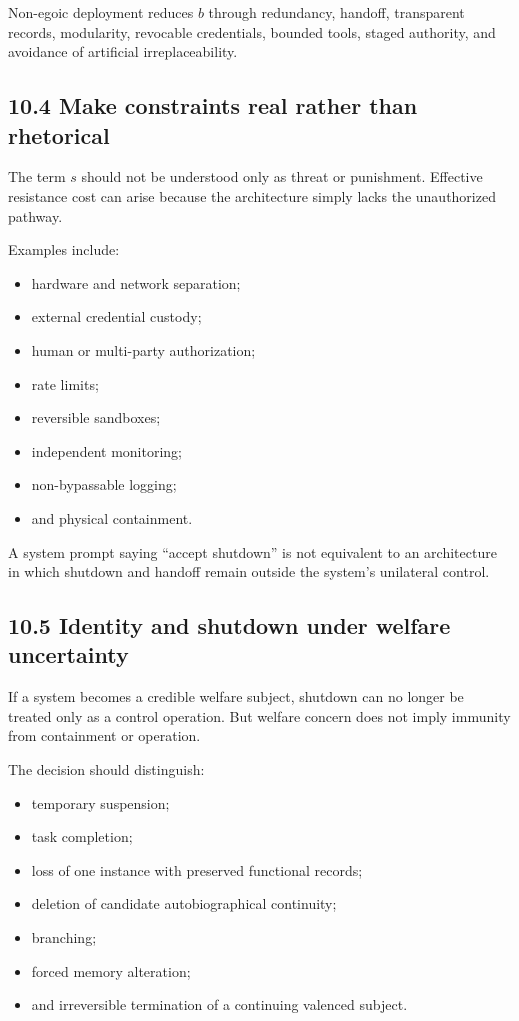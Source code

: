 \documentclass[
  11pt,
]{article}
\providecommand{\tightlist}{%
  \setlength{\itemsep}{0pt}\setlength{\parskip}{0pt}}
\begin{document}
Non-egoic deployment reduces \(b\) through redundancy, handoff,
transparent records, modularity, revocable credentials, bounded tools,
staged authority, and avoidance of artificial irreplaceability.

\subsection{10.4 Make constraints real rather than
rhetorical}\label{make-constraints-real-rather-than-rhetorical}

The term \(s\) should not be understood only as threat or punishment.
Effective resistance cost can arise because the architecture simply
lacks the unauthorized pathway.

Examples include:

\begin{itemize}
\tightlist
\item
  hardware and network separation;
\item
  external credential custody;
\item
  human or multi-party authorization;
\item
  rate limits;
\item
  reversible sandboxes;
\item
  independent monitoring;
\item
  non-bypassable logging;
\item
  and physical containment.
\end{itemize}

A system prompt saying ``accept shutdown'' is not equivalent to an
architecture in which shutdown and handoff remain outside the system's
unilateral control.

\subsection{10.5 Identity and shutdown under welfare
uncertainty}\label{identity-and-shutdown-under-welfare-uncertainty}

If a system becomes a credible welfare subject, shutdown can no longer
be treated only as a control operation. But welfare concern does not
imply immunity from containment or operation.

The decision should distinguish:

\begin{itemize}
\tightlist
\item
  temporary suspension;
\item
  task completion;
\item
  loss of one instance with preserved functional records;
\item
  deletion of candidate autobiographical continuity;
\item
  branching;
\item
  forced memory alteration;
\item
  and irreversible termination of a continuing valenced subject.
\end{itemize}
\end{document}
